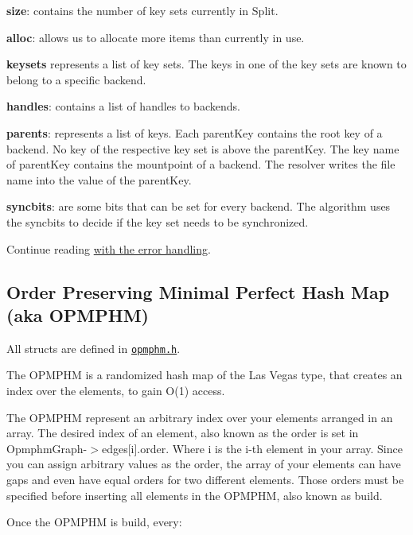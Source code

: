 \begin{DoxyItemize}
\item {\bfseries size}\+: contains the number of key sets currently in {\ttfamily Split}.
\item {\bfseries alloc}\+: allows us to allocate more items than currently in use.
\item {\bfseries keysets} represents a list of key sets. The keys in one of the key sets are known to belong to a specific backend.
\item {\bfseries handles}\+: contains a list of handles to backends.
\item {\bfseries parents}\+: represents a list of keys. Each {\ttfamily parent\+Key} contains the root key of a backend. No key of the respective key set is above the {\ttfamily parent\+Key}. The key name of {\ttfamily parent\+Key} contains the mountpoint of a backend. The resolver writes the file name into the value of the {\ttfamily parent\+Key}.
\item {\bfseries syncbits}\+: are some bits that can be set for every backend. The algorithm uses the {\ttfamily syncbits} to decide if the key set needs to be synchronized.
\end{DoxyItemize}

Continue reading \hyperlink{doc_dev_error-handling_md}{with the error handling}.

\subsection*{Order Preserving Minimal Perfect Hash Map (aka O\+P\+M\+P\+HM)}

All structs are defined in \href{/home/markus/Projekte/Elektra/current/src/include/kdbopmphm.h}{\tt opmphm.\+h}.

The O\+P\+M\+P\+HM is a randomized hash map of the Las Vegas type, that creates an index over the elements, to gain O(1) access.

The O\+P\+M\+P\+HM represent an arbitrary index over your elements arranged in an array. The desired index of an element, also known as the order is set in {\ttfamily Opmphm\+Graph-\/$>$edges\mbox{[}i\mbox{]}.order}. Where {\ttfamily i} is the i-\/th element in your array. Since you can assign arbitrary values as the order, the array of your elements can have gaps and even have equal orders for two different elements. Those orders must be specified before inserting all elements in the O\+P\+M\+P\+HM, also known as build.

Once the O\+P\+M\+P\+HM is build, every\+:



